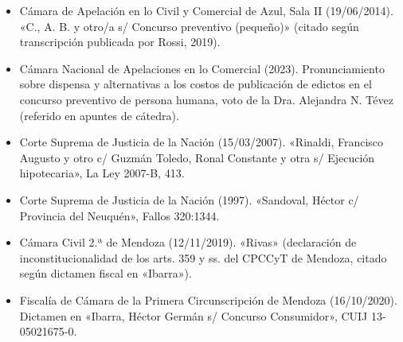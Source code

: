 \documentclass[12pt,oneside]{book}
\begin{document}
{\begin{itemize}[leftmargin=1.2em]
    \item Cámara de Apelación en lo Civil y Comercial de Azul, Sala II (19/06/2014). «C., A. B. y otro/a s/ Concurso preventivo (pequeño)» (citado según transcripción publicada por Rossi, 2019).
    \item Cámara Nacional de Apelaciones en lo Comercial (2023). Pronunciamiento sobre dispensa y alternativas a los costos de publicación de edictos en el concurso preventivo de persona humana, voto de la Dra. Alejandra N. Tévez (referido en apuntes de cátedra).
    \item Corte Suprema de Justicia de la Nación (15/03/2007). «Rinaldi, Francisco Augusto y otro c/ Guzmán Toledo, Ronal Constante y otra s/ Ejecución hipotecaria», La Ley 2007-B, 413.
    \item Corte Suprema de Justicia de la Nación (1997). «Sandoval, Héctor c/ Provincia del Neuquén», Fallos 320:1344.
    \item Cámara Civil 2.ª de Mendoza (12/11/2019). «Rivas» (declaración de inconstitucionalidad de los arts. 359 y ss. del CPCCyT de Mendoza, citado según dictamen fiscal en «Ibarra»).
    \item Fiscalía de Cámara de la Primera Circunscripción de Mendoza (16/10/2020). Dictamen en «Ibarra, Héctor Germán s/ Concurso Consumidor», CUIJ 13-05021675-0.
\end{itemize}
}
\end{document}

